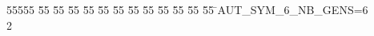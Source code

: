 %
%
\begin{tabbing}
55555 \= 55 \= 55 \= 55 \= 55 \= 55 \= 55 \= 55 \= 55 \= 55 \= 55 \= 55 \= 55 \= \>AUT\_SYM\_6\_NB\_GENS=6\\[0pt]
2\>\end{tabbing}
